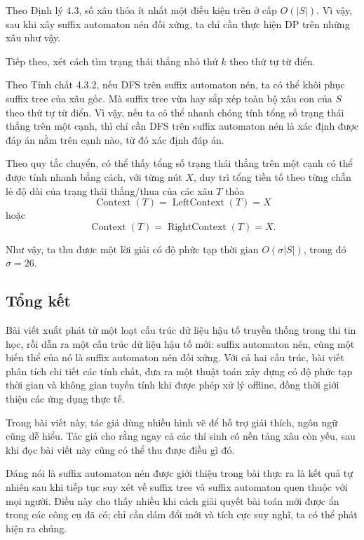\documentclass[11pt]{article}
\begin{document}
Theo Định lý 4.3, số xâu thỏa ít nhất một điều kiện trên ở cấp \(O(|S|)\). Vì
vậy, sau khi xây suffix automaton nén đối xứng, ta chỉ cần thực hiện DP trên
những xâu như vậy.

Tiếp theo, xét cách tìm trạng thái thắng nhỏ thứ \(k\) theo thứ tự từ điển.

Theo Tính chất 4.3.2, nếu DFS trên suffix automaton nén, ta có thể khôi phục
suffix tree của xâu gốc. Mà suffix tree vừa hay sắp xếp toàn bộ xâu con của
\(S\) theo thứ tự từ điển. Vì vậy, nếu ta có thể nhanh chóng tính tổng số trạng
thái thắng trên một cạnh, thì chỉ cần DFS trên suffix automaton nén là xác định
được đáp án nằm trên cạnh nào, từ đó xác định đáp án.

Theo quy tắc chuyển, có thể thấy tổng số trạng thái thắng trên một cạnh có thể
được tính nhanh bằng cách, với từng nút \(X\), duy trì tổng tiền tố theo từng
chẵn lẻ độ dài của trạng thái thắng/thua của các xâu \(T\) thỏa
\[
\operatorname{Context}(T)=\operatorname{LeftContext}(T)=X
\]
hoặc
\[
\operatorname{Context}(T)=\operatorname{RightContext}(T)=X.
\]

Như vậy, ta thu được một lời giải có độ phức tạp thời gian \(O(\sigma |S|)\),
trong đó \(\sigma=26\).

\subsection{Tổng kết}

Bài viết xuất phát từ một loạt cấu trúc dữ liệu hậu tố truyền thống trong thi
tin học, rồi dẫn ra một cấu trúc dữ liệu hậu tố mới: suffix automaton nén, cùng
một biến thể của nó là suffix automaton nén đối xứng. Với cả hai cấu trúc, bài
viết phân tích chi tiết các tính chất, đưa ra một thuật toán xây dựng có độ
phức tạp thời gian và không gian tuyến tính khi được phép xử lý offline, đồng
thời giới thiệu các ứng dụng thực tế.

Trong bài viết này, tác giả dùng nhiều hình vẽ để hỗ trợ giải thích, ngôn ngữ
cũng dễ hiểu. Tác giả cho rằng ngay cả các thí sinh có nền tảng xâu còn yếu,
sau khi đọc bài viết này cũng có thể thu được điều gì đó.

Đáng nói là suffix automaton nén được giới thiệu trong bài thực ra là kết quả
tự nhiên sau khi tiếp tục suy xét về suffix tree và suffix automaton quen thuộc
với mọi người. Điều này cho thấy nhiều khi cách giải quyết bài toán mới được
ẩn trong các công cụ đã có; chỉ cần dám đổi mới và tích cực suy nghĩ, ta có thể
phát hiện ra chúng.
\end{document}
